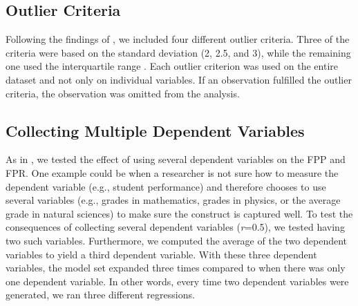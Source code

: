 \subsection{Outlier Criteria}
Following the findings of \cite{Leyes2013}, we included four different outlier criteria. Three of the criteria were based on the standard deviation (2, 2.5, and 3), while the remaining one used the interquartile range \citep{Rousseeuw2011}. Each outlier criterion was used on the entire dataset and not only on individual variables. If an observation fulfilled the outlier criteria, the observation was omitted from the analysis.

\subsection{Collecting Multiple Dependent Variables}
As in \cite{Simmons2011}, we tested the effect of using several dependent variables on the FPP and FPR. One example could be when a researcher is not sure how to measure the dependent variable (e.g., student performance) and therefore chooses to use several variables (e.g., grades in mathematics, grades in physics, or the average grade in natural sciences) to make sure the construct is captured well. To test the consequences of collecting several dependent variables (\textit{r}=0.5), we tested having two such variables. Furthermore, we computed the average of the two dependent variables to yield a third dependent variable. With these three dependent variables, the model set expanded three times compared to when there was only one dependent variable. In other words, every time two dependent variables were generated, we ran three different regressions. 


